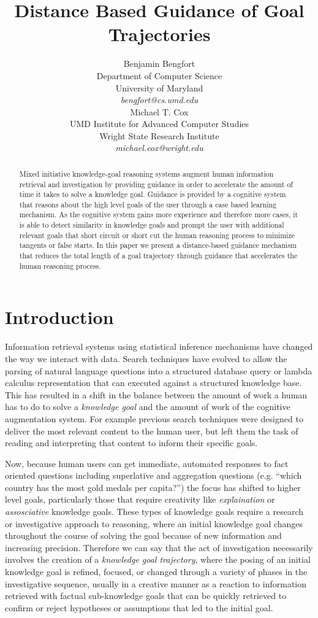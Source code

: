 \documentclass[letterpaper]{article}
\title{Distance Based Guidance of Goal Trajectories}
\author{Benjamin Bengfort\\
Department of Computer Science\\
University of Maryland\\
\textit{bengfort@cs.umd.edu}\\
\And
Michael T. Cox\\
UMD Institute for Advanced Computer Studies\\
Wright State Research Institute\\
\textit{michael.cox@wright.edu}
}
\begin{document}
    \maketitle

\begin{abstract}
Mixed initiative knowledge-goal reasoning systems augment human information retrieval and investigation by providing guidance in order to accelerate the amount of time it takes to solve a knowledge goal. Guidance is provided by a cognitive system that reasons about the high level goals of the user through a case based learning mechanism. As the cognitive system gains more experience and therefore more cases, it is able to detect similarity in knowledge goals and prompt the user with additional relevant goals that short circuit or short cut the human reasoning process to minimize tangents or false starts. In this paper we present a distance-based guidance mechanism that reduces the total length of a goal trajectory through guidance that accelerates the human reasoning process.
\end{abstract}

\section{Introduction}

Information retrieval systems using statistical inference mechanisms have changed the way we interact with data. Search techniques have evolved to allow the parsing of natural language questions into a structured database query \cite{yahya_natural_2012} or lambda calculus representation \cite{berant_semantic_2013} that can executed against a structured knowledge base. This has resulted in a shift in the balance between the amount of work a human has to do to solve a \textit{knowledge goal} and the amount of work of the cognitive augmentation system. For example previous search techniques were designed to deliver the most relevant content to the human user, but left them the task of reading and interpreting that content to inform their specific goals.

Now, because human users can get immediate, automated responses to fact oriented questions including superlative and aggregation questions (e.g. ``which country has the most gold medals per capita?'') the focus has shifted to higher level goals, particularly those that require creativity like \textit{explaination} or \textit{assosciative} knowledge goals. These types of knowledge goals require a research or investigative approach to reasoning, where an initial knowledge goal changes throughout the course of solving the goal because of new information and increasing precision. Therefore we can say that the act of investigation necessarily involves the creation of a \textit{knowledge goal trajectory}, where the posing of an initial knowledge goal is refined, focused, or changed through a variety of phases in the investigative sequence, usually in a creative manner as a reaction to information retrieved with factual sub-knowledge goals that can be quickly retrieved to confirm or reject hypotheses or assumptions that led to the initial goal.
\end{document}
